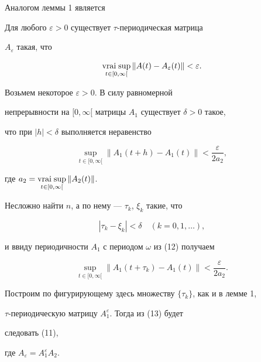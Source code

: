 Аналогом леммы 1 является 


 


\begin{lem} 


Для любого $\varepsilon>0$ существует $\tau$-периодическая матрица 


$A_\varepsilon$ такая, что 


\begin{equation} 


\vraisup_{t\in[0,\infty[}\|A(t)-A_\varepsilon(t)\|<\varepsilon. 


\end{equation} 


\end{lem} 


 


\begin{pf} 


Возьмем некоторое $\varepsilon>0$. В силу равномерной 


непрерывности на $[0,\infty[$ матрицы $A_1$ существует $\delta>0$ такое, 


что при $|h|<\delta$ выполняется неравенство 


\begin{equation}


\sup\limits_{t\in[0,\infty[}\|A_1(t+h)-A_1(t)\|< 


\frac{\varepsilon}{2a_2},


\end{equation}


где $a_2=\vraisup\limits_{t\in[0,\infty[}\|A_2(t)\|$. 


 


Несложно найти $n$, а по нему --- $\tau_k$, $\xi_k$ такие, что 


$$ 


|\tau_k-\xi_k|<\delta\quad (k=0,1,\dotsc), 


$$ 


и ввиду периодичности $A_1$ с периодом $\omega$ из (12) получаем 


\begin{equation} 


\sup_{t\in[0,\infty[}\|A_1(t+\tau_k)-A_1(t)\|< 


\frac{\varepsilon}{2a_2}. 


\end{equation} 


 


Построим по фигурирующему здесь множеству $\{\tau_k\}$, как и в лемме 1, 


$\tau$-периодическую матрицу $A^\varepsilon_1$. Тогда из (13) будет 


следовать (11), 


где $A_\varepsilon=A^\varepsilon_1A_2$. 


\end{pf} 



